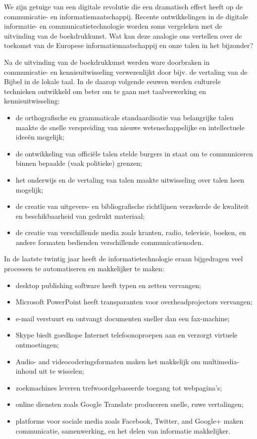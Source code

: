 \begin{multicols}{2}

We zijn getuige van een digitale revolutie die een dramatisch effect heeft op de communicatie- en informatiemaatschappij. Recente ontwikkelingen in de digitale informatie- en communicatietechnologie worden soms vergeleken met de uitvinding van de boekdrukkunst. Wat kan deze analogie ons vertellen over de toekomst van de Europese informatiemaatschappij en onze talen in het bijzonder?


 Na de uitvinding van de boekdrukkunst werden ware doorbraken in communicatie- en kennisuitwisseling verwezenlijkt door bijv. de vertaling van de Bijbel in de lokale taal. In de daarop volgende eeuwen werden culturele technieken ontwikkeld om beter om te gaan met taalverwerking en kennisuitwisseling:
    \begin{itemize}
      \item de orthografische en grammaticale standaardisatie van belangrijke talen maakte de snelle verspreiding van nieuwe wetenschappelijke en intellectuele idee{\"e}n mogelijk;
      \item de ontwikkeling van offici{\"e}le talen stelde burgers in staat om te communiceren binnen bepaalde (vaak politieke) grenzen;
 	  \item het onderwijs en de vertaling van talen maakte uitwisseling over talen heen mogelijk;
 	  \item de creatie van uitgevers- en bibliografische richtlijnen verzekerde de kwaliteit en beschikbaarheid van gedrukt materiaal;
 	  \item de creatie van verschillende media zoals kranten, radio, televisie, boeken, en andere formaten bedienden verschillende communicatienoden.
     \end{itemize}

     In de laatste twintig jaar heeft de informatietechnologie eraan bijgedragen veel processen te automatiseren en makkelijker te maken:
    \begin{itemize}
 	\item desktop publishing software heeft typen en zetten vervangen;
 	\item Microsoft PowerPoint heeft transparanten voor overheadprojectors vervangen;
 	\item e-mail verstuurt en ontvangt documenten sneller dan een fax-machine;
 	\item Skype biedt goedkope Internet telefoonoproepen aan en verzorgt virtuele ontmoetingen;
 	\item Audio- and videocoderingsformaten maken het makkelijk om multimedia-inhoud uit te wisselen;
 	\item zoekmachines leveren trefwoordgebaseerde toegang tot webpagina's;
 	\item online diensten zoals Google Translate produceren snelle, ruwe vertalingen;
 	\item platforms voor sociale media zoals Facebook, Twitter, and Google+ maken communicatie, samenwerking, en het delen van informatie makkelijker.
     \end{itemize}


\end{multicols}
